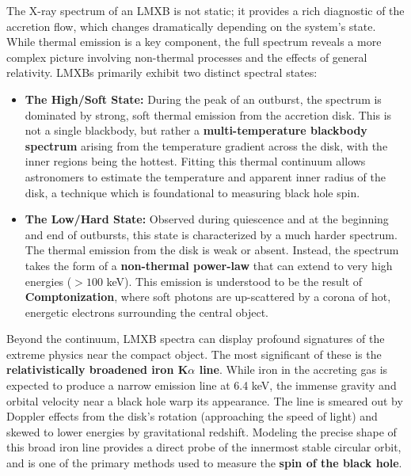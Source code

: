 The X-ray spectrum of an LMXB is not static; it provides a rich diagnostic of the accretion flow, which changes dramatically depending on the system's state. While thermal emission is a key component, the full spectrum reveals a more complex picture involving non-thermal processes and the effects of general relativity. LMXBs primarily exhibit two distinct spectral states:
\vspace{10pt}
\begin{itemize}
    \item \textbf{The High/Soft State:} During the peak of an outburst, the spectrum is dominated by strong, soft thermal emission from the accretion disk. This is not a single blackbody, but rather a \textbf{multi-temperature blackbody spectrum} arising from the temperature gradient across the disk, with the inner regions being the hottest. Fitting this thermal continuum allows astronomers to estimate the temperature and apparent inner radius of the disk, a technique which is foundational to measuring black hole spin.

    \item \textbf{The Low/Hard State:} Observed during quiescence and at the beginning and end of outbursts, this state is characterized by a much harder spectrum. The thermal emission from the disk is weak or absent. Instead, the spectrum takes the form of a \textbf{non-thermal power-law} that can extend to very high energies ($>100$ keV). This emission is understood to be the result of \textbf{Comptonization}, where soft photons are up-scattered by a corona of hot, energetic electrons surrounding the central object.
\end{itemize}
\vspace{10pt}
Beyond the continuum, LMXB spectra can display profound signatures of the extreme physics near the compact object. The most significant of these is the \textbf{relativistically broadened iron K$\alpha$ line}. While iron in the accreting gas is expected to produce a narrow emission line at 6.4 keV, the immense gravity and orbital velocity near a black hole warp its appearance. The line is smeared out by Doppler effects from the disk's rotation (approaching the speed of light) and skewed to lower energies by gravitational redshift. Modeling the precise shape of this broad iron line provides a direct probe of the innermost stable circular orbit, and is one of the primary methods used to measure the \textbf{spin of the black hole}.

\par


